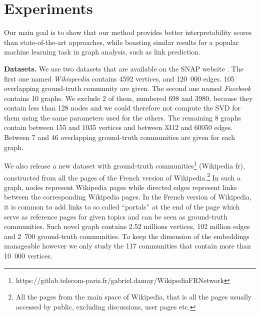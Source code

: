 
\section{Experiments}\label{sec:exp}

Our main goal is to show that our method provides better interpretability scores than state-of-the-art approaches, while boasting similar results for a popular machine learning task in graph analysis, such as link prediction. 

\noindent\textbf{Datasets.}
We use two datasets that are available on the SNAP website \cite{SNAP_paper}. The first one named \textit{Wikispeedia} contains 4592 vertices, and 120~000 edges. 105 overlapping ground-truth community are given. The second one named \textit{Facebook} contains 10 graphs. We exclude 2 of them, numbered 698 and 3980, because they contain less than 128 nodes and we could therefore not compute the SVD for them using the same parameters used for the others. The remaining 8 graphs contain between 155 and 1035 vertices and between 3312 and 60050 edges. Between 7 and 46 overlapping ground-truth communities are given for each graph.

We also release a new dataset with ground-truth communities\footnote{https://gitlab.telecom-paris.fr/gabriel.damay/WikipediaFRNetwork} (Wikipedia fr), constructed from all the pages of the French version of Wikipedia.\footnote{All the pages from the main space of Wikipedia, that is all the pages usually accessed by public, excluding discussions, user pages etc.} In such a graph, nodes represent Wikipedia pages while directed edges represent links between the corresponding Wikipedia pages. In the French version of Wikipedia, it is common to add links to so called ``portals'' at the end of the page which serve as reference pages for given topics and can be seen as ground-truth communities. %
Such novel graph contains 2.52 millions vertices, 102 million edges and 2~700 ground-truth communities. To keep the dimension of the embeddings manageable however we only study the 117 communities that contain more than 10~000 vertices.

